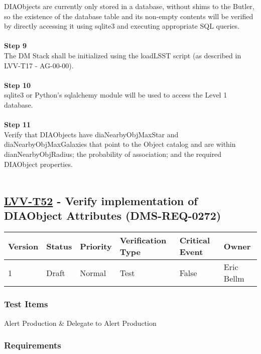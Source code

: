 DIAObjects are currently only stored in a database, without shims to the
Butler, so the existence of the database table and its non-empty
contents will be verified by directly accessing it using sqlite3 and
executing appropriate SQL queries.\\
~\\
\textbf{Step 9}\\
The DM Stack shall be initialized using the loadLSST script (as
described in LVV-T17 - AG-00-00).\\
~\\
\textbf{Step 10}\\
sqlite3 or Python's sqlalchemy module will be used to access the Level 1
database.\\
~\\
\textbf{Step 11}\\
Verify that DIAObjects have diaNearbyObjMaxStar and
diaNearbyObjMaxGalaxies that point to the Object catalog and are within
dianNearbyObjRadius; the probability of association; and the required
DIAObject properties.\\
~\\

\hypertarget{lvv-t52---verify-implementation-of-diaobject-attributes-dms-req-0272}{%
\subsection{\texorpdfstring{\href{https://jira.lsstcorp.org/secure/Tests.jspa\#/testCase/LVV-T52}{LVV-T52}
- Verify implementation of DIAObject Attributes
(DMS-REQ-0272)}{LVV-T52 - Verify implementation of DIAObject Attributes (DMS-REQ-0272)}}\label{lvv-t52---verify-implementation-of-diaobject-attributes-dms-req-0272}}

\begin{longtable}[]{@{}llllll@{}}
\toprule
Version & Status & Priority & Verification Type & Critical Event &
Owner\tabularnewline
\midrule
\endhead
1 & Draft & Normal & Test & False & Eric Bellm\tabularnewline
\bottomrule
\end{longtable}

\hypertarget{test-items-28}{%
\subsubsection{Test Items}\label{test-items-28}}

Alert Production \& Delegate to Alert Production

\hypertarget{requirements-29}{%
\subsubsection{Requirements}\label{requirements-29}}

